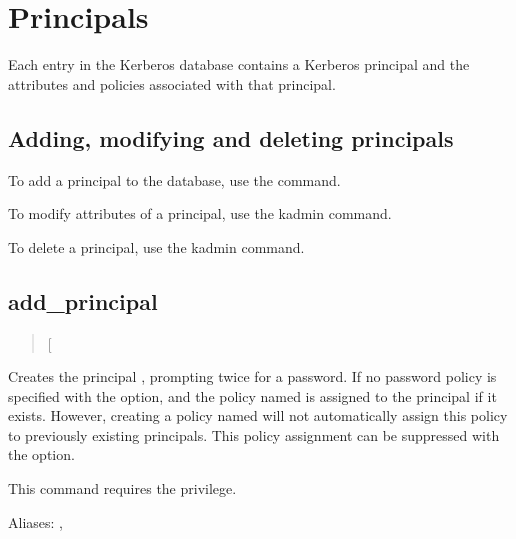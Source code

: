 \documentclass[letterpaper,10pt,english]{sphinxmanual}
\begin{document}
\section{Principals}
\label{\detokenize{admin/database:principals}}
Each entry in the Kerberos database contains a Kerberos principal and
the attributes and policies associated with that principal.


\subsection{Adding, modifying and deleting principals}
\label{\detokenize{admin/database:add-mod-del-princs}}\label{\detokenize{admin/database:adding-modifying-and-deleting-principals}}
To add a principal to the database, use the {\hyperref[\detokenize{admin/admin_commands/kadmin_local:kadmin-1}]{}}
 command.

To modify attributes of a principal, use the kadmin
 command.

To delete a principal, use the kadmin  command.


\subsection{add\_principal}
\label{\detokenize{admin/database:add-principal}}\begin{quote}

 {[}\sphinxstyleemphasis{options}{]} 
\end{quote}

Creates the principal , prompting twice for a password.  If
no password policy is specified with the  option, and the
policy named  is assigned to the principal if it exists.
However, creating a policy named  will not automatically
assign this policy to previously existing principals.  This policy
assignment can be suppressed with the  option.

This command requires the  privilege.

Aliases: , 
\end{document}
